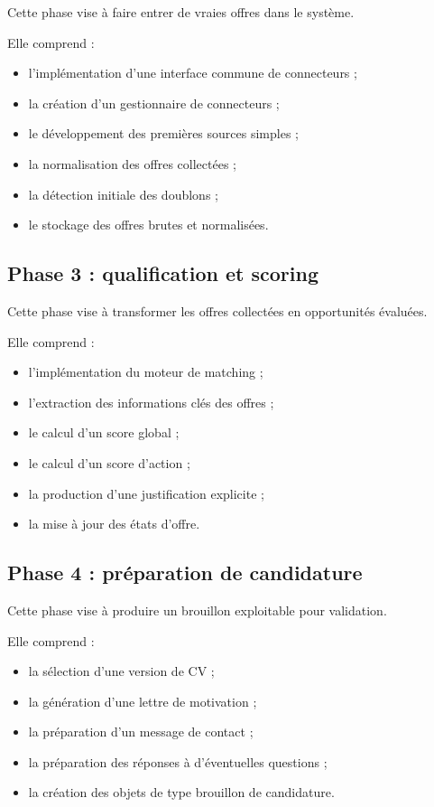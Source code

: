 \documentclass[11pt,a4paper]{article}
\begin{document}
Cette phase vise à faire entrer de vraies offres dans le système.

Elle comprend :

\begin{itemize}
    \item l’implémentation d’une interface commune de connecteurs ;
    \item la création d’un gestionnaire de connecteurs ;
    \item le développement des premières sources simples ;
    \item la normalisation des offres collectées ;
    \item la détection initiale des doublons ;
    \item le stockage des offres brutes et normalisées.
\end{itemize}

\subsection{Phase 3 : qualification et scoring}

Cette phase vise à transformer les offres collectées en opportunités évaluées.

Elle comprend :

\begin{itemize}
    \item l’implémentation du moteur de matching ;
    \item l’extraction des informations clés des offres ;
    \item le calcul d’un score global ;
    \item le calcul d’un score d’action ;
    \item la production d’une justification explicite ;
    \item la mise à jour des états d’offre.
\end{itemize}

\subsection{Phase 4 : préparation de candidature}

Cette phase vise à produire un brouillon exploitable pour validation.

Elle comprend :

\begin{itemize}
    \item la sélection d’une version de CV ;
    \item la génération d’une lettre de motivation ;
    \item la préparation d’un message de contact ;
    \item la préparation des réponses à d’éventuelles questions ;
    \item la création des objets de type brouillon de candidature.
\end{itemize}
\end{document}
